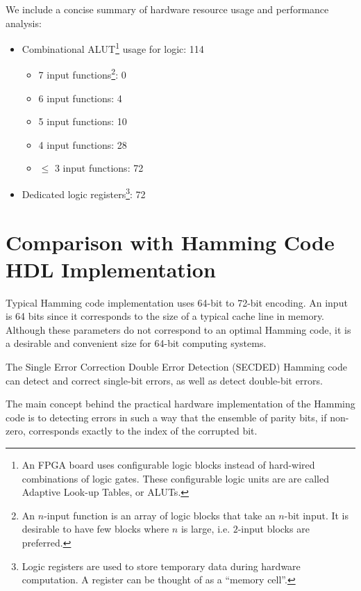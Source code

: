\documentclass[conference]{IEEEtran}
\begin{document}
We include a concise summary of hardware resource usage and performance analysis:
\begin{itemize}
  \item Combinational ALUT\footnote{An FPGA board uses configurable logic blocks instead of hard-wired combinations of logic gates. These configurable logic units are are called Adaptive Look-up Tables, or ALUTs.} usage for logic: 114 \begin{itemize}
      \item 7 input functions\footnote{An $n$-input function is an array of logic blocks that take an $n$-bit input. It is desirable to have few blocks where $n$ is large, i.e. $2$-input blocks are preferred.}: 0
    \item 6 input functions: 4
    \item 5 input functions: 10
    \item 4 input functions: 28
    \item $\leq$ 3 input functions: 72
  \end{itemize}
\item Dedicated logic registers\footnote{Logic registers are used to store temporary data during hardware computation. A register can be thought of as a ``memory cell''.}: 72
\end{itemize}

\section{Comparison with Hamming Code HDL Implementation}
Typical Hamming code implementation uses 64-bit to 72-bit encoding.
An input is 64 bits since it corresponds to the size of a typical cache line in memory.
Although these parameters do not correspond to an optimal Hamming code, it is a desirable and convenient size for 64-bit computing systems.

The Single Error Correction Double Error Detection (SECDED) Hamming code can detect and correct single-bit errors, as well as detect double-bit errors.

The main concept behind the practical hardware implementation of the Hamming code is to detecting errors in such a way that the ensemble of parity bits, if non-zero, corresponds exactly to the index of the corrupted bit.
\end{document}
